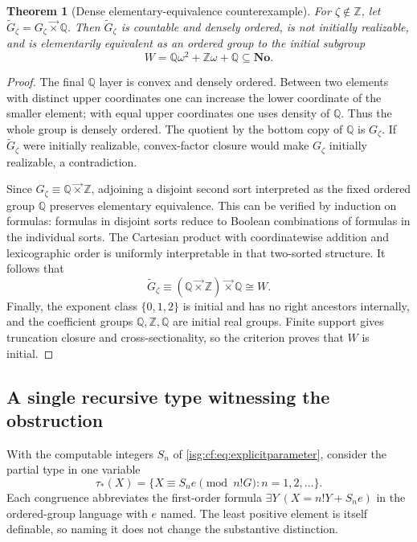 \documentclass[11pt]{article}
\newtheorem{theorem}{Theorem}[section]
\theoremstyle{definition}
\theoremstyle{remark}
\newcommand{\No}{\ensuremath{\mathbf{No}}}
\newcommand{\Z}{\mathbb{Z}}
\newcommand{\lex}{\mathbin{\overrightarrow{\times}}}
\newcommand{\Q}{\mathbb{Q}}
\begin{document}
\begin{theorem}[Dense elementary-equivalence counterexample]\label{isg:cf:thm:dense}
For $\zeta\notin\Z$, let $\widetilde G_\zeta=G_\zeta\lex\Q$.
Then $\widetilde G_\zeta$ is countable and densely ordered, is not
initially realizable, and is elementarily equivalent as an ordered group
to the initial subgroup
\[
 W=\Q\omega^2+\Z\omega+\Q\subseteq\No.
\]
\end{theorem}
\begin{proof}
The final $\Q$ layer is convex and densely ordered. Between two elements
with distinct upper coordinates one can increase the lower coordinate
of the smaller element; with equal upper coordinates one uses density
of $\Q$. Thus the whole group is densely ordered.
The quotient by the bottom copy of $\Q$ is $G_\zeta$. If
$\widetilde G_\zeta$ were initially realizable, convex-factor closure
would make $G_\zeta$ initially realizable, a contradiction.

Since $G_\zeta\equiv\Q\lex\Z$, adjoining a disjoint second sort
interpreted as the fixed ordered group $\Q$ preserves elementary
equivalence. This can be verified by induction on formulas: formulas
in disjoint sorts reduce to Boolean combinations of formulas in the
individual sorts. The Cartesian product with coordinatewise addition
and lexicographic order is uniformly interpretable in that two-sorted
structure. It follows that
\[
 \widetilde G_\zeta\equiv(\Q\lex\Z)\lex\Q\cong W.
\]
Finally, the exponent class $\{0,1,2\}$ is initial and has no right
ancestors internally, and the coefficient groups $\Q,\Z,\Q$ are
initial real groups. Finite support gives truncation closure and
cross-sectionality, so the criterion proves that $W$ is initial.
\end{proof}

\subsection{A single recursive type witnessing the obstruction}
With the computable integers $S_n$ of \eqref{isg:cf:eq:explicitparameter},
consider the partial type in one variable
\begin{equation}\label{isg:cf:eq:type}
 \tau_*(X)=\{X\equiv S_ne\pmod{n!G}:n=1,2,\ldots\}.
\end{equation}
Each congruence abbreviates the first-order formula
$\exists Y\ (X=n!Y+S_ne)$ in the ordered-group language with $e$ named.
The least positive element is itself definable, so naming it does not
change the substantive distinction.
\end{document}
